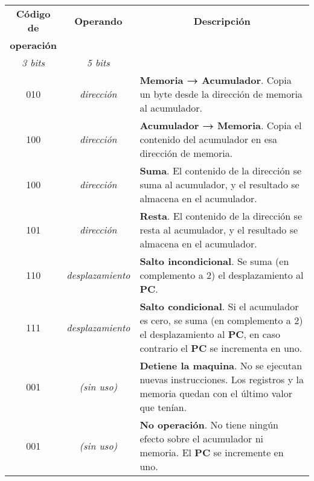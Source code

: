 \documentclass[12pt]{article}
\begin{document}
\begin{tabularx}{\textwidth}{c|c|X}

    \textbf{Código de} & \textbf{Operando} &
    \multicolumn{1}{c}{\textbf{Descripción}} \\
    \textbf{operación} & & \\
    \emph{3 bits} & \emph{5 bits} & \\
    \hline
    \hline

    010 & \emph{dirección} & \textbf{Memoria → Acumulador}. Copia un byte
    desde la dirección de memoria al acumulador. \\
    \hline

    100 & \emph{dirección} & \textbf{Acumulador → Memoria}. Copia el contenido
    del acumulador en esa dirección de memoria. \\
    \hline

    100 & \emph{dirección} & \textbf{Suma}. El contenido de la dirección se
    suma al acumulador, y el resultado se almacena en el acumulador. \\
    \hline

    101 & \emph{dirección} & \textbf{Resta}. El contenido de la dirección se
    resta al acumulador, y el resultado se almacena en el acumulador. \\
    \hline

    110 & \emph{desplazamiento} & \textbf{Salto incondicional}. Se suma (en
    complemento a 2) el desplazamiento al \textbf{PC}. \\
    \hline

    111 & \emph{desplazamiento} & \textbf{Salto condicional}. Si el acumulador
    es cero, se suma (en complemento a 2) el desplazamiento al \textbf{PC}, en
    caso contrario el \textbf{PC} se incrementa en uno. \\
    \hline

    001 & \emph{(sin uso)} & \textbf{Detiene la maquina}. No se ejecutan
    nuevas instrucciones. Los registros y la memoria quedan con el último
    valor que tenían. \\
    \hline

    001 & \emph{(sin uso)} & \textbf{No operación}. No tiene ningún efecto
    sobre el acumulador ni memoria. El \textbf{PC} se incremente en uno. \\

\end{tabularx}
\end{document}
